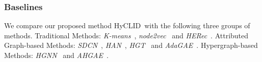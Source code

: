 \documentclass[11pt]{article}
\def\modelname{HyCLID}
\begin{document}
\subsubsection{Baselines}
We compare our proposed method \modelname~with the following three groups of methods.
{Traditional Methods: }
\textit{K-means}~\cite{hartigan_algorithm_1979}, \textit{node2vec}~\cite{grover_node2vec_2016} and \textit{HERec}~\cite{shi2018heterogeneous}.
{Attributed Graph-based Methods: }
\textit{SDCN}~\cite{bo_structural_2020}, \textit{HAN}~\cite{wang_heterogeneous_2019}, \textit{HGT}~\cite{hu_heterogeneous_2020} and \textit{AdaGAE}~\cite{li_adaptive_2021}.
{Hypergraph-based Methods: }
\textit{HGNN}~\cite{feng_hypergraph_2019} and \textit{AHGAE}~\cite{hu_adaptive_2021}.
%
%
%
\end{document}
